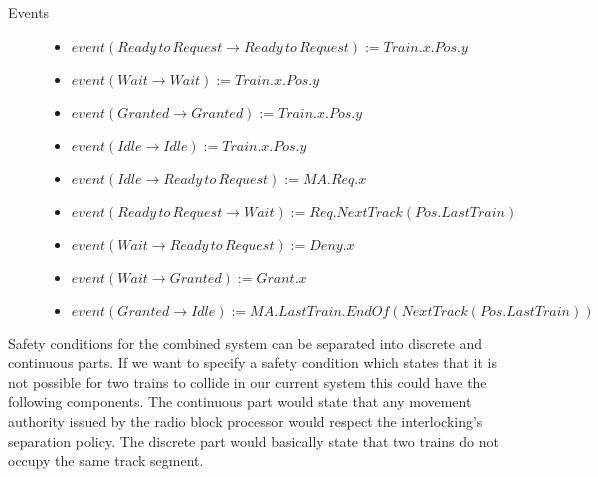 \begin{mydef}
\begin{description}
\item[Events] \hspace*{0mm}
\begin{itemize}
\item $event(Ready \, to \, Request \to Ready \, to \, Request) := Train.x.Pos.y$
	\item $event(Wait \to Wait) := Train.x.Pos.y$
	\item $event(Granted \to Granted) := Train.x.Pos.y $
         \item $event(Idle \to Idle) := Train.x.Pos.y$
	\item $event(Idle \to Ready \, to \, Request) := MA.Req.x $
	\item $event(Ready \, to \, Request \to Wait) := Req.NextTrack(Pos.LastTrain)$
	\item $event(Wait \to Ready \, to \, Request) := Deny.x$
	\item $event(Wait \to Granted) := Grant.x$
	\item $event(Granted \to Idle) := MA.LastTrain.EndOf(NextTrack(Pos.LastTrain))$
\end{itemize}

\end{description}

\end{mydef}


Safety conditions for the combined system can be separated into discrete and continuous parts.  If we want to specify a safety condition which states that it is not possible for two trains to collide in our current system this could have the following components. The continuous part would state that any movement authority issued by the radio block processor would respect the interlocking's separation policy. The discrete part would basically state that two trains do not occupy the same track segment.

\FloatBarrier

